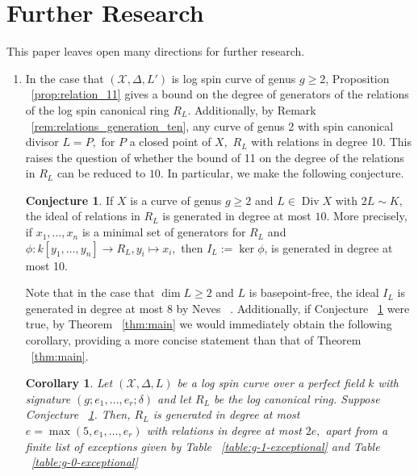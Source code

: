 \documentclass{amsart}
\theoremstyle{plain}
\newtheorem{cor}[thm]{Corollary}
\theoremstyle{definition}
\newtheorem{conjecture}[thm]{Conjecture}
\theoremstyle{remark}
\numberwithin{equation}{section}
\newcommand \sx{\mathscr X}
\DeclareMathOperator\di{Div}
\newcommand{\halfcan}{L}
\begin{document}
\section{Further Research}
\label{sec:further-questions}

This paper leaves open many directions for further research.

\begin{enumerate}
	\item In the case that $(\sx,\Delta, \halfcan')$ is log spin curve of genus $g \geq 2$, Proposition ~\ref{prop:relation_11} gives a bound on the degree of generators of the relations of the log spin canonical ring $R_L$. Additionally, by Remark ~\ref{rem:relations_generation_ten}, any curve of genus 2 with spin canonical divisor $L = P,$ for $P$ a closed point of $X,$  $R_L$ with relations in degree 10. This raises the question of whether the bound of 11 on the degree of the relations in $R_L$ can be reduced to $10$. In particular, we make the following conjecture.
\begin{conjecture}
\label{conj:relations-10}
If $X$ is a curve of genus $g \geq 2$ and $L \in \di X$ with $2L \sim K,$ the ideal of relations in $R_L$ is generated in degree at most $10$. More precisely, if $x_1,\ldots, x_n$ is a minimal set of generators for $R_L$ and $\phi:k[y_1,\ldots, y_n] \rightarrow R_L, y_i \mapsto x_i,$ then $I_L := \ker \phi$, is generated in degree at most 10. 
\end{conjecture}
Note that in the case that $\dim L \geq 2$ and $L$ is basepoint-free, the ideal $I_L$ is generated in degree at most 8 by Neves ~\cite[Proposition III.12]{neves:halfcan}. Additionally, if Conjecture ~\ref{conj:relations-10} were true, by Theorem ~\ref{thm:main} we would immediately obtain the following corollary, providing a more concise statement than that of Theorem ~\ref{thm:main}.
\begin{cor}
\label{cor:main-refined}
Let $(\sx,\Delta,L)$ be a log spin curve over a perfect field $k$ with signature $(g;e_1,\ldots, e_r;\delta)$ and let $R_L$ be the log canonical ring. Suppose Conjecture ~\ref{conj:relations-10}. Then, $R_L$ is generated in degree at most $e = \max(5,e_1,\ldots, e_r)$ with relations in degree at most $2e,$ apart from a finite list of exceptions given by Table ~\ref{table:g-1-exceptional} and Table ~\ref{table:g-0-exceptional}
\end{cor}

\end{enumerate}
\end{document}
